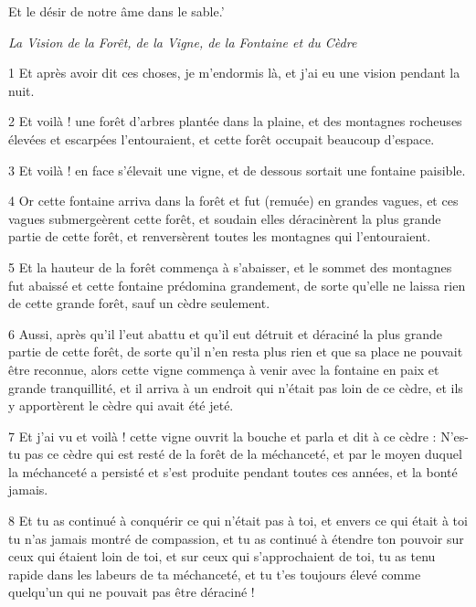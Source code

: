 \par Et le désir de notre âme dans le sable.'


\par \textit{La Vision de la Forêt, de la Vigne, de la Fontaine et du Cèdre}

\par 1 Et après avoir dit ces choses, je m'endormis là, et j'ai eu une vision pendant la nuit.

\par 2 Et voilà ! une forêt d'arbres plantée dans la plaine, et des montagnes rocheuses élevées et escarpées l'entouraient, et cette forêt occupait beaucoup d'espace.

\par 3 Et voilà ! en face s'élevait une vigne, et de dessous sortait une fontaine paisible.

\par 4 Or cette fontaine arriva dans la forêt et fut (remuée) en grandes vagues, et ces vagues submergeèrent cette forêt, et soudain elles déracinèrent la plus grande partie de cette forêt, et renversèrent toutes les montagnes qui l'entouraient.

\par 5 Et la hauteur de la forêt commença à s'abaisser, et le sommet des montagnes fut abaissé et cette fontaine prédomina grandement, de sorte qu'elle ne laissa rien de cette grande forêt, sauf un cèdre seulement.

\par 6 Aussi, après qu'il l'eut abattu et qu'il eut détruit et déraciné la plus grande partie de cette forêt, de sorte qu'il n'en resta plus rien et que sa place ne pouvait être reconnue, alors cette vigne commença à venir avec la fontaine en paix et grande tranquillité, et il arriva à un endroit qui n'était pas loin de ce cèdre, et ils y apportèrent le cèdre qui avait été jeté.

\par 7 Et j'ai vu et voilà ! cette vigne ouvrit la bouche et parla et dit à ce cèdre : N'es-tu pas ce cèdre qui est resté de la forêt de la méchanceté, et par le moyen duquel la méchanceté a persisté et s'est produite pendant toutes ces années, et la bonté jamais.

\par 8 Et tu as continué à conquérir ce qui n'était pas à toi, et envers ce qui était à toi tu n'as jamais montré de compassion, et tu as continué à étendre ton pouvoir sur ceux qui étaient loin de toi, et sur ceux qui s'approchaient de toi, tu as tenu rapide dans les labeurs de ta méchanceté, et tu t'es toujours élevé comme quelqu'un qui ne pouvait pas être déraciné !


